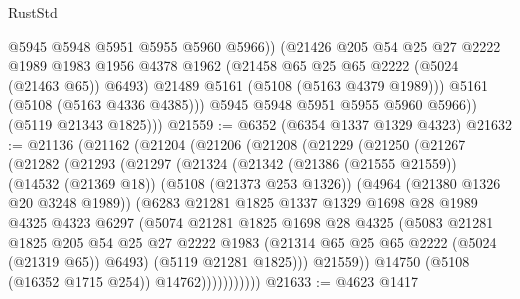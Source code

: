 \begin{lexlean}{RustStd}
\begin{coremodule}
                  @5945
                  @5948
                  @5951
                  @5955
                  @5960
                  @5966))
              (@21426
                @205
                @54
                @25
                @27
                @2222
                @1989
                @1983
                @1956
                @4378
                @1962
                (@21458 @65 @25 @65 @2222 (@5024 (@21463 @65)) @6493)
                @21489
                @5161
                (@5108 (@5163 @4379 @1989)))
              @5161
              (@5108 (@5163 @4336 @4385)))
            @5945
            @5948
            @5951
            @5955
            @5960
            @5966))
        (@5119 @21343 @1825)))
@21559 := @6352 (@6354 @1337 @1329 @4323)
@21632 := @21136
    (@21162
      (@21204
        (@21206
          (@21208
            (@21229
              (@21250
                (@21267
                  (@21282
                    (@21293
                      (@21297
                        (@21324
                          (@21342
                            (@21386 (@21555 @21559))
                            (@14532 (@21369 @18))
                            (@5108 (@21373 @253 @1326))
                            (@4964 (@21380 @1326 @20 @3248 @1989))
                            (@6283
                              @21281
                              @1825
                              @1337
                              @1329
                              @1698
                              @28
                              @1989
                              @4325
                              @4323
                              @6297
                              (@5074
                                @21281
                                @1825
                                @1698
                                @28
                                @4325
                                (@5083
                                  @21281
                                  @1825
                                  @205
                                  @54
                                  @25
                                  @27
                                  @2222
                                  @1983
                                  (@21314 @65 @25 @65 @2222 (@5024 (@21319 @65)) @6493)
                                  (@5119 @21281 @1825)))
                              @21559))
                          @14750
                          (@5108 (@16352 @1715 @254))
                          @14762)))))))))))
@21633 := @4623 @1417

\end{coremodule}
\end{lexlean}
